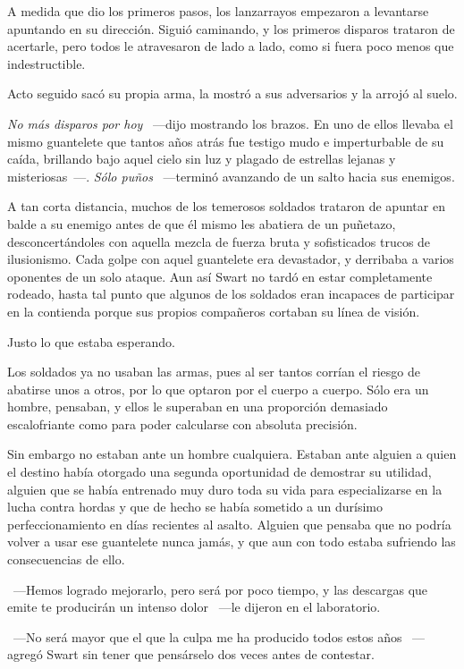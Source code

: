 A medida que dio los primeros pasos, los lanzarrayos empezaron a levantarse apuntando en su dirección. Siguió caminando, y los primeros disparos trataron de acertarle, pero todos le atravesaron de lado a lado, como si fuera poco menos que indestructible.

Acto seguido sacó su propia arma, la mostró a sus adversarios y la arrojó al suelo.

\emph{No más disparos por hoy} ~---dijo mostrando los brazos. En uno de ellos llevaba el mismo guantelete que tantos años atrás fue testigo mudo e imperturbable de su caída, brillando bajo aquel cielo sin luz y plagado de estrellas lejanas y misteriosas~---. \emph{Sólo puños} ~---terminó avanzando de un salto hacia sus enemigos.

A tan corta distancia, muchos de los temerosos soldados trataron de apuntar en balde a su enemigo antes de que él mismo les abatiera de un puñetazo, desconcertándoles con aquella mezcla de fuerza bruta y sofisticados trucos de ilusionismo. Cada golpe con aquel guantelete era devastador, y derribaba a varios oponentes de un solo ataque. Aun así Swart no tardó en estar completamente rodeado, hasta tal punto que algunos de los soldados eran incapaces de participar en la contienda porque sus propios compañeros cortaban su línea de visión.

Justo lo que estaba esperando.

Los soldados ya no usaban las armas, pues al ser tantos corrían el riesgo de abatirse unos a otros, por lo que optaron por el cuerpo a cuerpo. Sólo era un hombre, pensaban, y ellos le superaban en una proporción demasiado escalofriante como para poder calcularse con absoluta precisión.

Sin embargo no estaban ante un hombre cualquiera. Estaban ante alguien a quien el destino había otorgado una segunda oportunidad de demostrar su utilidad, alguien que se había entrenado muy duro toda su vida para especializarse en la lucha contra hordas y que de hecho se había sometido a un durísimo perfeccionamiento en días recientes al asalto. Alguien que pensaba que no podría volver a usar ese guantelete nunca jamás, y que aun con todo estaba sufriendo las consecuencias de ello.

~---Hemos logrado mejorarlo, pero será por poco tiempo, y las descargas que emite te producirán un intenso dolor ~---le dijeron en el laboratorio.

~---No será mayor que el que la culpa me ha producido todos estos años ~---agregó Swart sin tener que pensárselo dos veces antes de contestar.

